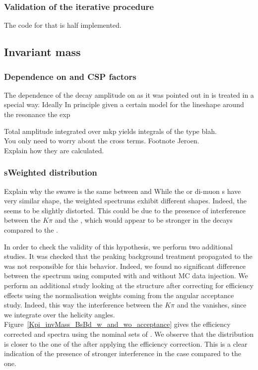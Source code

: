 \subsubsection{Validation of the iterative procedure}
{\color{red} The code for that is half implemented.}

\subsection{\Kpi Invariant mass}
\label{Kpi_Invariant_mass}

\subsubsection{Dependence on \mkpi and CSP factors}
The dependence of the \BJpsiKpi decay amplitude on \mkpi as it was pointed out in  is treated in a special way.
Ideally  
In principle given a certain model for the \mkpi lineshape around the \Kst resonance the exp
  
Total amplitude integrated over mkp yields integrals of the type blah.\\
You only need to worry about the cross terms. Footnote Jeroen.\\
Explain how they are calculated.\\

\subsubsection{sWeighted \mkpi distribution}
Explain why the swawe is the same between \Bs and \Bd
While the \Bs or \Bd di-muon \sPlot s have very similar shape, the \mkpi weighted spectrums exhibit different shapes. 
Indeed, the \Bs \mkpi \sPlot seems to be slightly distorted. This could be due to the presence of interference between
 the $K\pi$ \swave and the \Kstarz, which would appear to be stronger in the \Bs decays compared to the \Bd. 

In order to check the validity of this hypothesis, we perform two additional studies. 
It was checked that the peaking background treatment propagated to the \sWeights was not responsible for this behavior.
Indeed, we found no significant difference between the \Bs \mkpi spectrum using \sWeights computed with and without MC 
data injection. We perform an additional study looking at the \mkpi structure after correcting for efficiency effects 
using the normalisation weights coming from the angular acceptance study. Indeed, this way the interference between the 
$K\pi$ \swave and the \Kstarz \pwave vanishes, since we integrate over the helicity angles. Figure~\ref{Kpi_invMass_BsBd_w_and_wo_acceptance}
 gives the efficiency corrected \Bs and \Bd \mkpi spectra using the nominal sets of \sWeights. We observe that the \Bs \mkpi distribution
 is closer to the one of the \Bd after applying the efficiency correction. This is a clear indication of the presence of stronger interference 
in the \Bs case compared to the \Bd one. 


